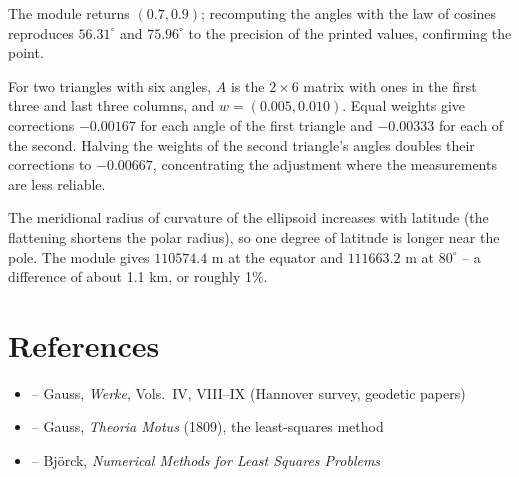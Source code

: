 \begin{solution}
The module returns $(0.7, 0.9)$; recomputing the angles with the law of cosines reproduces $56.31^\circ$ and $75.96^\circ$ to the precision of the printed values, confirming the point.
\end{solution}

\begin{solution}
For two triangles with six angles, $A$ is the $2 \times 6$ matrix with ones in the first three and last three columns, and $w = (0.005, 0.010)$. Equal weights give corrections $-0.00167$ for each angle of the first triangle and $-0.00333$ for each of the second. Halving the weights of the second triangle's angles doubles their corrections to $-0.00667$, concentrating the adjustment where the measurements are less reliable.
\end{solution}

\begin{solution}
The meridional radius of curvature of the ellipsoid increases with latitude (the flattening shortens the polar radius), so one degree of latitude is longer near the pole. The module gives $110574.4$ m at the equator and $111663.2$ m at $80^\circ$ -- a difference of about 1.1 km, or roughly 1\%.
\end{solution}

\section{References}

\begin{itemize}
    \item \cite{gauss-works} -- Gauss, \textit{Werke}, Vols.~IV, VIII--IX (Hannover survey, geodetic papers)
    \item \cite{gauss-theoria} -- Gauss, \textit{Theoria Motus} (1809), the least-squares method
    \item \cite{bjorck} -- Bj\"orck, \textit{Numerical Methods for Least Squares Problems}
\end{itemize}
